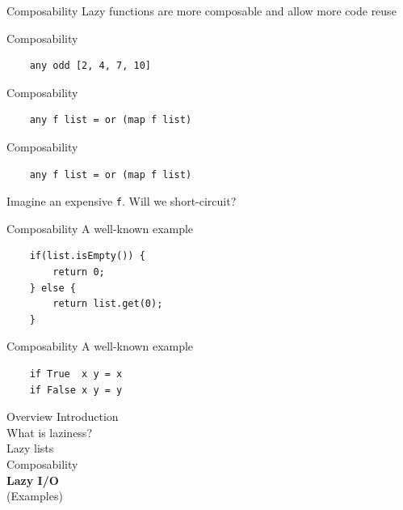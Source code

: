 \documentclass[20pt]{beamer}
\newcommand{\vspaced}{
    \vspace{5mm}
}
\begin{document}
\begin{frame}{Composability}
    Lazy functions are more composable and allow more code reuse
\end{frame}

\begin{frame}[fragile]{Composability}
    \begin{lstlisting}
    any odd [2, 4, 7, 10]
    \end{lstlisting}
\end{frame}

\begin{frame}[fragile]{Composability}
    \begin{lstlisting}
    any f list = or (map f list)
    \end{lstlisting}
\end{frame}

\begin{frame}[fragile]{Composability}
    \begin{lstlisting}
    any f list = or (map f list)
    \end{lstlisting}
    \vspaced
    Imagine an expensive \texttt{f}. Will we short-circuit?
\end{frame}

\begin{frame}[fragile]{Composability}
    A well-known example
    \vspaced
    \begin{lstlisting}
    if(list.isEmpty()) {
        return 0;
    } else {
        return list.get(0);
    }
    \end{lstlisting}
\end{frame}

\begin{frame}[fragile]{Composability}
    A well-known example
    \vspaced
    \begin{lstlisting}
    if True  x y = x
    if False x y = y
    \end{lstlisting}
\end{frame}


\begin{frame}{Overview}
    Introduction \\
    What is laziness? \\
    Lazy lists \\
    Composability \\
    \textbf{Lazy I/O} \\
    (Examples)
\end{frame}
\end{document}
